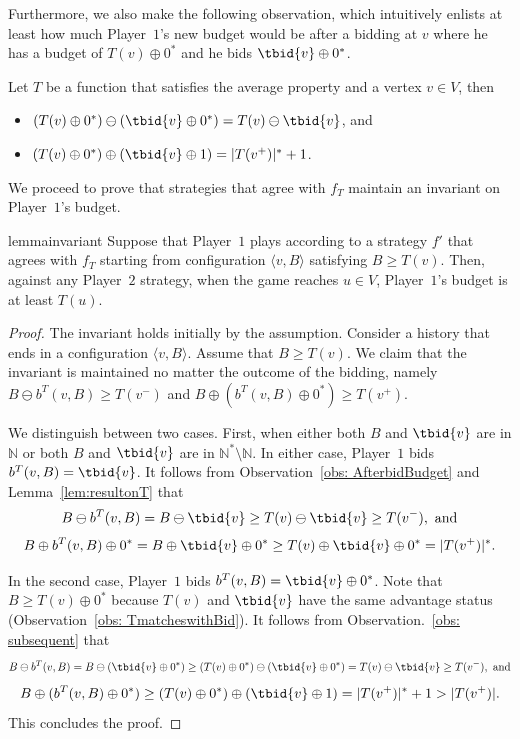 \documentclass{theoretics}
\newcommand{\PO}{Player~$1$\xspace}
\newcommand{\PT}{Player~$2$\xspace}
\newcommand{\Nat}{\mathbb{N}}
\newcommand{\Natstro}{\mathbb{N}^* \setminus \mathbb{N}}
\newcommand{\zug}[1]{\langle #1  \rangle}
\newcommand{\succb}[1]{#1 \oplus 0^*\xspace}
\begin{document}
Furthermore, we also make the following observation, which intuitively enlists at least how much \PO's new budget would be after a bidding at \(v\) where he has a budget of \(\succb{T(v)}\) and he bids \(\succb{\tbid{v}}\).  


\begin{observation}\label{obs: subsequent}
	Let \(T\) be a function that satisfies the average property and a vertex \(v \in V\), then 
	\begin{itemize}
		\item $(\succb{T(v)}) \ominus (\succb{\tbid{v}}) = T(v) \ominus \tbid{v}$\label{itm: claimd}, and 
		\item $(\succb{T(v)}) \oplus (\tbid{v} \oplus 1) = |T(v^+)|^* + 1$. \label{itm: claime}
	\end{itemize}
\end{observation}


We proceed to prove that strategies that agree with $f_T$ maintain an invariant on \PO's budget. 

\begin{restatable}{lemma}{invariant}
	\label{lem: invariant}
	Suppose that \PO plays according to a strategy $f'$ that agrees with $f_T$ starting from configuration $\zug{v, B}$ satisfying $B \geq T(v)$. 
	Then, against any \PT strategy, when the game reaches \(u \in V\), \PO's budget is at least \(T(u)\).
\end{restatable}

\begin{proof}
The invariant holds initially by the assumption. 
Consider a history that ends in a configuration $\zug{v, B}$. Assume that \(B \geq T(v)\). We claim that the invariant is maintained no matter the outcome of the bidding, namely $B \ominus b^T(v,B) \geq T(v^-)$ and $B \oplus  (\succb{b^T(v,B)}) \geq T(v^+)$.


	We distinguish between two cases. 
	First, when either both \(B\) and \(\tbid{v}\) are in \(\Nat\) or both \(B\) and \(\tbid{v}\) are in  \(\Natstro\). 
	In either case, \PO bids \(b^T(v, B) = \tbid{v}\). 
	It follows from Observation~\ref{obs: AfterbidBudget} and Lemma~\ref{lem:resultonT} that
	\[B \ominus b^T(v, B) = B \ominus \tbid{v} \geq T(v) \ominus \tbid{v} \geq T(v^-), \text{ and}\] 
	\[B \oplus b^T(v, B) \oplus 0^* = B \oplus \tbid{v} \oplus 0^* \geq T(v) \oplus \tbid{v} \oplus 0^* = |T(v^+)|^*.\]
	
	
In the second case, \PO bids \(b^T(v, B) = \succb{\tbid{v}}\). 
	Note that  \(B \geq  \succb{T(v)}\) because \(T(v)\) and \(\tbid{v}\) have the same advantage status (Observation~\ref{obs: TmatcheswithBid}). 
It follows from Observation.~\ref{obs: subsequent} that
	\[B \ominus b^T(v, B) = B \ominus (\succb{\tbid{v}}) \geq (\succb{T(v)}) \ominus (\succb{\tbid{v}}) = T(v) \ominus \tbid{v} \geq T(v^-), \text{ and}\] 
	\[B \oplus (\succb{b^T(v, B)}) \geq (\succb{T(v)}) \oplus (\tbid{v} \oplus 1) = |T(v^+)|^* + 1 > |T(v^+)|.\] 
	This concludes the proof. 
\end{proof}
\end{document}
